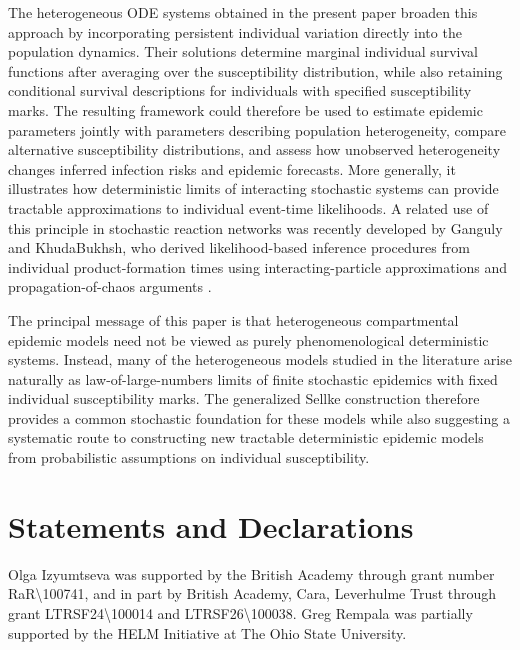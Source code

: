 \documentclass[pdflatex,sn-mathphys-ay]{sn-jnl}
\theoremstyle{thmstyleone}
\theoremstyle{thmstyletwo}
\theoremstyle{thmstylethree}
\begin{document}
The heterogeneous ODE systems obtained in the present paper broaden this
approach by incorporating persistent individual variation directly into the
population dynamics. Their solutions determine marginal individual survival
functions after averaging over the susceptibility distribution, while also
retaining conditional survival descriptions for individuals with specified
susceptibility marks. The resulting framework could therefore be used to
estimate epidemic parameters jointly with parameters describing population
heterogeneity, compare alternative susceptibility distributions, and assess
how unobserved heterogeneity changes inferred infection risks and epidemic
forecasts. More generally, it illustrates how deterministic limits of
interacting stochastic systems can provide tractable approximations to
individual event-time likelihoods. A related use of this principle in
stochastic reaction networks was recently developed by Ganguly and
KhudaBukhsh, who derived likelihood-based inference procedures from
individual product-formation times using interacting-particle approximations
and propagation-of-chaos arguments
\citep{GangulyKhudaBukhsh2026}.


The principal message of this paper is that heterogeneous compartmental
epidemic models need not be viewed as purely phenomenological deterministic
systems. Instead, many of the heterogeneous models studied in the literature
arise naturally as law-of-large-numbers limits of finite stochastic epidemics
with fixed individual susceptibility marks. The generalized Sellke
construction therefore provides a common stochastic foundation for these
models while also suggesting a systematic route to constructing new
tractable deterministic epidemic models from probabilistic assumptions on
individual susceptibility.



\section*{Statements and Declarations}

Olga Izyumtseva was supported by the British Academy through grant number RaR{\textbackslash}100741, and in part by British Academy, Cara, Leverhulme Trust through grant LTRSF24{\textbackslash}100014 and LTRSF26{\textbackslash}100038. Greg Rempala was partially supported by the  HELM Initiative at The Ohio State University.  

\end{document}
